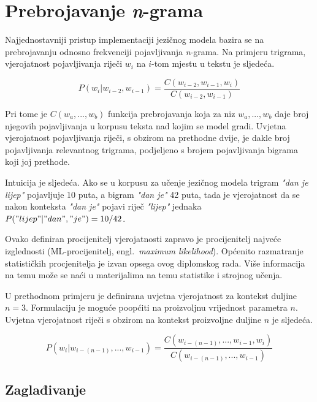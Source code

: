 \documentclass[times, utf8, diplomski, numeric]{fer}
\begin{document}
\chapter{Prebrojavanje \textit{n}-grama}
\label{sec:prebrojavanje}

Najjednostavniji pristup implementaciji jezičnog modela bazira se na prebrojavanju odnosno frekvenciji pojavljivanja \textit{n}-grama. Na primjeru trigrama, vjerojatnost pojavljivanja riječi $w_i$ na $i$-tom mjestu u tekstu je sljedeća.

\[
P(w_i | w_{i - 2}, w_{i - 1}) = \frac{C(w_{i - 2}, w_{i - 1}, w_i)}{C(w_{i - 2}, w_{i - 1})}
\]

Pri tome je $C(w_a, ... , w_b)$ funkcija prebrojavanja koja za niz $w_a, ... , w_b$ daje broj njegovih pojavljivanja u korpusu teksta nad kojim se model gradi. Uvjetna vjerojatnost pojavljivanja riječi, s obzirom na prethodne dvije, je dakle broj pojavljivanja relevantnog trigrama, podjeljeno s brojem pojavljivanja bigrama koji joj prethode. 

Intuicija je sljedeća. Ako se u korpusu za učenje jezičnog modela trigram \textit{"dan je lijep"} pojavljuje 10 puta, a bigram \textit{"dan je"} 42 puta, tada je vjerojatnost da se nakon konteksta \textit{"dan je"} pojavi riječ \textit{"lijep"} jednaka $P("lijep" | "dan", "je") = 10 / 42$.

Ovako definiran procijenitelj vjerojatnosti zapravo je procijenitelj  najveće izglednosti (ML-procijenitelj, engl.\ \textit{maximum likelihood}). Općenito razmatranje statističkih procjenitelja je izvan opsega ovog diplomskog rada. Više informacija na temu može se naći u materijalima na temu statistike i strojnog učenja.

U prethodnom primjeru je definirana uvjetna vjerojatnost za kontekst duljine $n = 3$. Formulaciju je moguće poopćiti na proizvoljnu vrijednost parametra $n$. Uvjetna vjerojatnost riječi s obzirom na kontekst proizvoljne duljine $n$ je sljedeća.

\begin{equation}
\label{eq:ngram_freq}
P(w_i | w_{i - (n - 1)}, ... , w_{i - 1}) = \frac{C(w_{i - (n - 1)}, ... , w_{i - 1}, w_i)}{C(w_{i - (n - 1)}, ... , w_{i - 1})}
\end{equation}

\section{Zaglađivanje}
\end{document}

